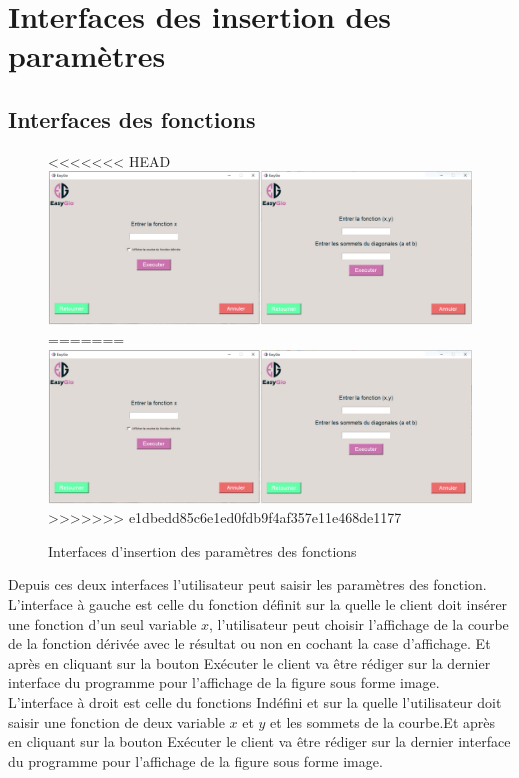 \documentclass[a4paper]{report}
\begin{document}
\section{Interfaces des insertion des paramètres}
\subsection{Interfaces des fonctions}
\begin{figure}[!h]
    \centering
<<<<<<< HEAD
    \includegraphics[width=15cm]{images/InputesInter.PNG}
=======
    \includegraphics[width=14cm]{images/InputesInter.PNG}
>>>>>>> e1dbedd85c6e1ed0fdb9f4af357e11e468de1177
    \caption{Interfaces d'insertion des paramètres des fonctions}
    \label{fig:Interfaces d'insertion des paramètres des fonctions}
\end{figure}
Depuis ces deux interfaces l'utilisateur peut saisir les paramètres des fonction.\\
L'interface à gauche est celle du fonction définit sur la quelle le client doit insérer une fonction d'un seul variable $x$, l'utilisateur peut choisir l'affichage de la courbe de la fonction dérivée avec le résultat ou non en cochant la case d'affichage. Et après en cliquant sur la bouton Exécuter le client va être rédiger sur la dernier interface du programme pour l'affichage de la figure sous forme image.\\
L'interface à droit est celle du fonctions Indéfini et sur la quelle l'utilisateur doit saisir une fonction de deux variable $x$ et $y$ et les sommets de la courbe.Et après en cliquant sur la bouton Exécuter le client va être rédiger sur la dernier interface du programme pour l'affichage de la figure sous forme image.\\
\end{document}
